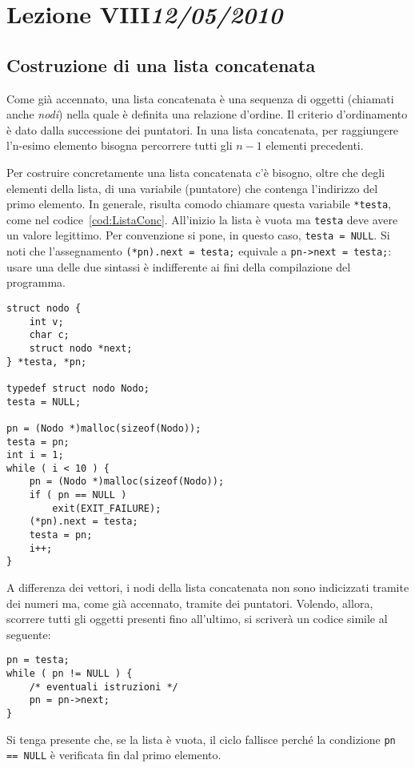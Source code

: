 \chapter[Lezione VIII]{Lezione VIII\newline\small\emph{12/05/2010}}
	\section{Costruzione di una lista concatenata}
Come già accennato, una lista concatenata è una sequenza di oggetti (chiamati anche \emph{nodi}) nella quale è definita una relazione d'ordine. Il criterio d'ordinamento è dato dalla successione dei puntatori. In una lista concatenata, per raggiungere l'n-esimo elemento bisogna percorrere tutti gli $n-1$ elementi precedenti.

Per costruire concretamente una lista concatenata c'è bisogno, oltre che degli elementi della lista, di una variabile (puntatore) che contenga l'indirizzo del primo elemento. In generale, risulta comodo chiamare questa variabile \lstinline!*testa!, come nel codice~\vref{cod:ListaConc}. All'inizio la lista è vuota ma \lstinline!testa! deve avere un valore legittimo. Per convenzione si pone, in questo caso, \lstinline!testa = NULL!. Si noti che l'assegnamento \lstinline!(*pn).next = testa;! equivale a \lstinline!pn->next = testa;!: usare una delle due sintassi è indifferente ai fini della compilazione del programma.
\begin{lstlisting}[caption={\em Costruzione di una lista concatenata.}, label={cod:ListaConc}]
struct nodo {
	int v;
	char c;
	struct nodo *next;
} *testa, *pn;

typedef struct nodo Nodo;
testa = NULL;

pn = (Nodo *)malloc(sizeof(Nodo));
testa = pn;
int i = 1;
while ( i < 10 ) {
	pn = (Nodo *)malloc(sizeof(Nodo));	
	if ( pn == NULL )
		exit(EXIT_FAILURE);
	(*pn).next = testa;
	testa = pn;
	i++;
} 
\end{lstlisting}

A differenza dei vettori, i nodi della lista concatenata non sono indicizzati tramite dei numeri ma, come già accennato, tramite dei puntatori. Volendo, allora, scorrere tutti gli oggetti presenti fino all'ultimo, si scriverà un codice simile al seguente:
\begin{lstlisting}
pn = testa;
while ( pn != NULL ) {
	/* eventuali istruzioni */
	pn = pn->next;
}
\end{lstlisting}
Si tenga presente che, se la lista è vuota, il ciclo fallisce perché la condizione \lstinline!pn == NULL! è verificata fin dal primo elemento.

